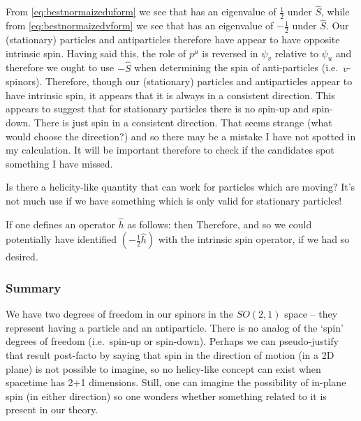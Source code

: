 From \eqref{eq:bestnormaizeduform} we see that
%
has an eigenvalue of $\frac 1 2$ under $\hat S$, while from \eqref{eq:bestnormaizedvform} we see that
%
has an eigenvalue of $-\frac 1 2$ under $\hat S$.  Our (stationary) particles and antiparticles therefore have appear to have opposite intrinsic spin. Having said this, the role of $p^\mu$ is reversed in $\psi_v$ relative to $\psi_u$ and therefore we ought to use $-\hat S$ when determining the spin of anti-particles (i.e.~$v$-spinors).
Therefore, though our (stationary) particles and antiparticles appear to have intrinsic spin, it appears that it is always in a consistent direction. This appears to suggest that for stationary particles there is no spin-up and spin-down. There is just spin in a consistent direction. That seems strange (what would choose the direction?) and so there may be a mistake I have not spotted in my calculation. It will be important therefore to check if the candidates spot something I have missed.

Is there a helicity-like quantity that can work for particles which are moving? It's not much use if we have something which is only valid for stationary particles!  



If one defines an operator $\hat h$ as follows:
then 
Therefore,
%
and so we could potentially have identified $(-\frac 1 2 \hat h)$ with the intrinsic spin operator, if we had so desired.



\subsubsection{Summary}
We have two degrees of freedom in our spinors in the $SO(2,1)$ space -- they represent having a particle and an antiparticle. There is no analog of the `spin' degrees of freedom (i.e.~spin-up or spin-down). Perhaps we can pseudo-justify that result post-facto by saying that spin in the direction of motion (in a 2D plane) is not possible to imagine, so no helicy-like concept can exist when spacetime has 2+1 dimensions.  Still, one can imagine the possibility of in-plane spin (in either direction) so one wonders whether something related to it is present in our theory. 

\endanswer